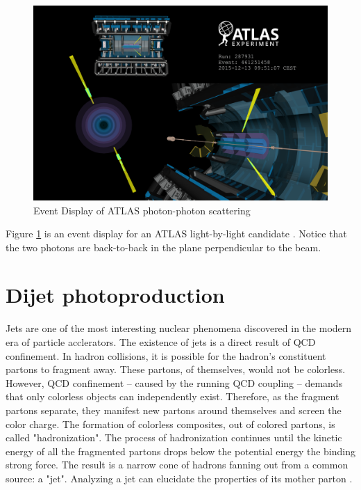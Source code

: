 \begin{figure}[h!]
\begin{centering}
\includegraphics[width=5in]{Chapter2/importfigs/light-by-light-figure_2.png}
\par\end{centering}
\caption{Event Display of ATLAS photon-photon scattering \cite{Collaboration:2278547} \label{fig:atlasEvent}}
\end{figure}

Figure \ref{fig:atlasEvent} is an event display for an ATLAS light-by-light candidate \cite{Collaboration:2278547}. Notice that the two photons are back-to-back in the plane perpendicular to the beam.

\section{Dijet photoproduction}

Jets are one of the most interesting nuclear phenomena discovered in the modern era of particle acclerators. The existence of jets is a direct result of QCD confinement. In hadron collisions, it is possible for the hadron's constituent partons to fragment away. These partons, of themselves, would not be colorless. However, QCD confinement -- caused by the running QCD coupling -- demands that only colorless objects can independently exist. Therefore, as the fragment partons separate, they manifest new partons around themselves and screen the color charge. The formation of colorless composites, out of colored partons, is called "hadronization". The process of hadronization continues until the kinetic energy of all the fragmented partons drops below the potential energy the binding strong force. The result is a narrow cone of hadrons fanning out from a common source: a "jet". Analyzing a jet can elucidate the properties of its mother parton \cite{d'Enterria:2004nv}.  

